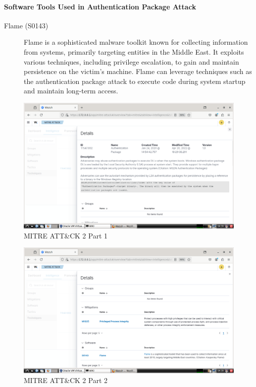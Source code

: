 \documentclass[12pt,a4paper]{report}
\begin{document}
\paragraph{Software Tools Used in Authentication Package Attack}
\begin{description}
	\item[Flame (S0143)] Flame is a sophisticated malware toolkit known for collecting information from systems, primarily targeting entities in the Middle East. It exploits various techniques, including privilege escalation, to gain and maintain persistence on the victim’s machine. Flame can leverage techniques such as the authentication package attack to execute code during system startup and maintain long-term access.
\end{description}

\begin{figure}[H]
\centering
\includegraphics[width=\textwidth]{ATTK 2 PIC 01.png}
\caption{MITRE ATT\&CK 2 Part 1}
\end{figure}

\begin{figure}[H]
\centering
\includegraphics[width=\textwidth]{ATTK 2 PIC 02.png}
\caption{MITRE ATT\&CK 2 Part 2}
\end{figure}
\end{document}
